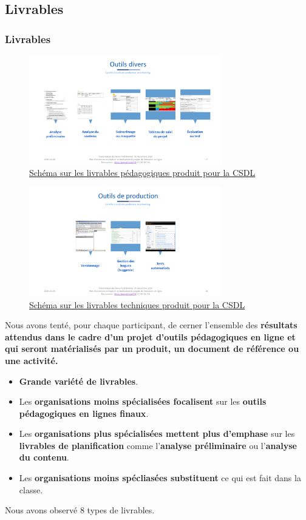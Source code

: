 						 \subsection{Livrables} 
						\begin{frame}[allowframebreaks]
						\frametitle{Livrables}
						\begin{figure}
                     			\centering
                    			 \includegraphics[width = 0.75\textwidth]{livrables1.png}
                     			\caption{\tiny{\href{run:livrables1.png}{Schéma sur les livrables pédagogiques produit pour la CSDL}}}
                   			\end{figure}
                   			\begin{figure}
                     			\centering
                    			 \includegraphics[width = 0.75\textwidth]{livrables2.png}
                     			\caption{\tiny{\href{run:livrables2.png}{Schéma sur les livrables techniques produit pour la CSDL}}}
                   			\end{figure}
                   			
                        			Nous avons tenté, pour chaque participant, de cerner l’ensemble des \textbf{résultats attendus dans le cadre d’un projet d’outils pédagogiques en ligne et qui seront matérialisés par un produit, un document de référence ou une activité.}
						\begin{itemize}
							\item \textbf{Grande variété de livrables}.
							\item Les \textbf{organisations moins spécialisées focalisent} sur les \textbf{outils pédagogiques en lignes finaux}.
							\item Les \textbf{organisations plus spécialisées mettent plus d'emphase} sur les \textbf{livrables de planification} comme l'\textbf{analyse préliminaire} ou l'\textbf{analyse du contenu}.
							\item Les \textbf{organisations moins spécliasées substituent} ce qui est fait dans la classe.
						\end{itemize}		
						Nous avons observé 8 types de livrables.
						

\end{frame}
